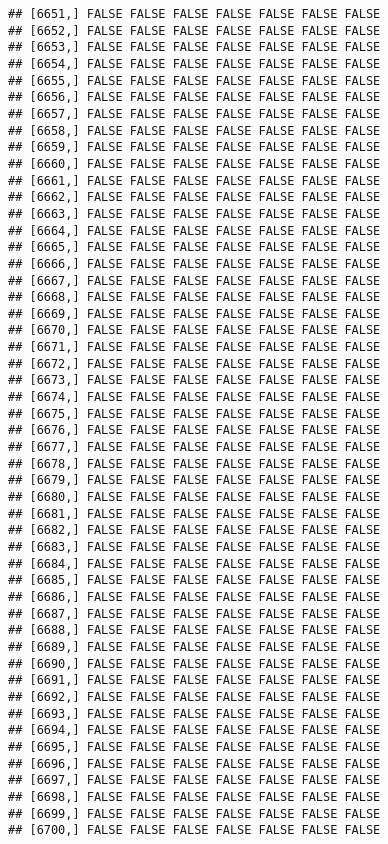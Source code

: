 \documentclass[
]{article}
\begin{document}
\begin{verbatim}
## [6651,] FALSE FALSE FALSE FALSE FALSE FALSE FALSE
## [6652,] FALSE FALSE FALSE FALSE FALSE FALSE FALSE
## [6653,] FALSE FALSE FALSE FALSE FALSE FALSE FALSE
## [6654,] FALSE FALSE FALSE FALSE FALSE FALSE FALSE
## [6655,] FALSE FALSE FALSE FALSE FALSE FALSE FALSE
## [6656,] FALSE FALSE FALSE FALSE FALSE FALSE FALSE
## [6657,] FALSE FALSE FALSE FALSE FALSE FALSE FALSE
## [6658,] FALSE FALSE FALSE FALSE FALSE FALSE FALSE
## [6659,] FALSE FALSE FALSE FALSE FALSE FALSE FALSE
## [6660,] FALSE FALSE FALSE FALSE FALSE FALSE FALSE
## [6661,] FALSE FALSE FALSE FALSE FALSE FALSE FALSE
## [6662,] FALSE FALSE FALSE FALSE FALSE FALSE FALSE
## [6663,] FALSE FALSE FALSE FALSE FALSE FALSE FALSE
## [6664,] FALSE FALSE FALSE FALSE FALSE FALSE FALSE
## [6665,] FALSE FALSE FALSE FALSE FALSE FALSE FALSE
## [6666,] FALSE FALSE FALSE FALSE FALSE FALSE FALSE
## [6667,] FALSE FALSE FALSE FALSE FALSE FALSE FALSE
## [6668,] FALSE FALSE FALSE FALSE FALSE FALSE FALSE
## [6669,] FALSE FALSE FALSE FALSE FALSE FALSE FALSE
## [6670,] FALSE FALSE FALSE FALSE FALSE FALSE FALSE
## [6671,] FALSE FALSE FALSE FALSE FALSE FALSE FALSE
## [6672,] FALSE FALSE FALSE FALSE FALSE FALSE FALSE
## [6673,] FALSE FALSE FALSE FALSE FALSE FALSE FALSE
## [6674,] FALSE FALSE FALSE FALSE FALSE FALSE FALSE
## [6675,] FALSE FALSE FALSE FALSE FALSE FALSE FALSE
## [6676,] FALSE FALSE FALSE FALSE FALSE FALSE FALSE
## [6677,] FALSE FALSE FALSE FALSE FALSE FALSE FALSE
## [6678,] FALSE FALSE FALSE FALSE FALSE FALSE FALSE
## [6679,] FALSE FALSE FALSE FALSE FALSE FALSE FALSE
## [6680,] FALSE FALSE FALSE FALSE FALSE FALSE FALSE
## [6681,] FALSE FALSE FALSE FALSE FALSE FALSE FALSE
## [6682,] FALSE FALSE FALSE FALSE FALSE FALSE FALSE
## [6683,] FALSE FALSE FALSE FALSE FALSE FALSE FALSE
## [6684,] FALSE FALSE FALSE FALSE FALSE FALSE FALSE
## [6685,] FALSE FALSE FALSE FALSE FALSE FALSE FALSE
## [6686,] FALSE FALSE FALSE FALSE FALSE FALSE FALSE
## [6687,] FALSE FALSE FALSE FALSE FALSE FALSE FALSE
## [6688,] FALSE FALSE FALSE FALSE FALSE FALSE FALSE
## [6689,] FALSE FALSE FALSE FALSE FALSE FALSE FALSE
## [6690,] FALSE FALSE FALSE FALSE FALSE FALSE FALSE
## [6691,] FALSE FALSE FALSE FALSE FALSE FALSE FALSE
## [6692,] FALSE FALSE FALSE FALSE FALSE FALSE FALSE
## [6693,] FALSE FALSE FALSE FALSE FALSE FALSE FALSE
## [6694,] FALSE FALSE FALSE FALSE FALSE FALSE FALSE
## [6695,] FALSE FALSE FALSE FALSE FALSE FALSE FALSE
## [6696,] FALSE FALSE FALSE FALSE FALSE FALSE FALSE
## [6697,] FALSE FALSE FALSE FALSE FALSE FALSE FALSE
## [6698,] FALSE FALSE FALSE FALSE FALSE FALSE FALSE
## [6699,] FALSE FALSE FALSE FALSE FALSE FALSE FALSE
## [6700,] FALSE FALSE FALSE FALSE FALSE FALSE FALSE

\end{verbatim}
\end{document}

